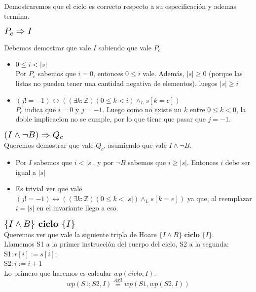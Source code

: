 \documentclass[a4paper]{article}
\begin{document}
Demostraremos que el ciclo es correcto respecto a su especificación y ademas termina.
	\begin{flushleft}$\scalebox{1.3}{$P_c\Rightarrow I$}$\end{flushleft}
	Debemos demostrar que vale $I$ sabiendo que vale $P_c$ 
	\begin{itemize}
		\item $ 0\leq i< |s|$\smallskip \\
		Por $P_c$ sabemos que $i=0$, entonces $0\leq i $ vale. Además, $|s|\geq 0$ (porque las listas no pueden tener una cantidad 
		negativa de elementos), luegos $|s|\geq i$
		\item $ (j!=-1)\leftrightarrow ((\exists k:\mathbb{Z})(0\leq k<i)\wedge_L s[k=e])$\smallskip \\
		$P_c$ indica que $i=0$ y $j=-1$. Luego como no existe un $k$ entre $0\leq k <0$, la doble implicacion no se cumple, por lo
		 que tiene que pasar que $j=-1$.
	\end{itemize}	 
	$\scalebox{1.3}{$(I\wedge \neg B)\Rightarrow Q_c$}$\smallskip \\
	Queremos demostrar que vale $Q_c$, asumiendo que vale  $I\wedge \neg B$.
	\begin{itemize}
	\item Por $I$ sabemos que $i< |s|$, y por $\neg B$ sabemos que $i\geq |s|$. Entonces $i$ debe ser igual a $|s|$
	\item Es trivial ver que vale $ (j!=-1)\leftrightarrow ((\exists k:\mathbb{Z})(0\leq k<|s|)\wedge_L s[k=e])$ ya que, al reemplazar
	 $i=|s|$ en el invariante llego a eso.
	\end{itemize}
	$\scalebox{1.3}{$\{I\wedge B\} \textbf{ ciclo } \{I\}$}$\medskip \\
	Queremos ver que vale la siguiente tripla de Hoare $\{I\wedge B\} \textbf{ ciclo } \{I\}$.\\
	Llamemos S1 a la primer instrucción del cuerpo del ciclo, S2 a la segunda:\\
	S1$: r[i]:=s[i];$\\
	S2$: i:=i+1$\\
	Lo primero que haremos es calcular $wp(ciclo,I)$.
	\begin{equation}wp(S1;S2,I)\stackrel{Ax3}{\equiv}wp(S1,wp(S2,I))\end{equation}
	
\end{document}
